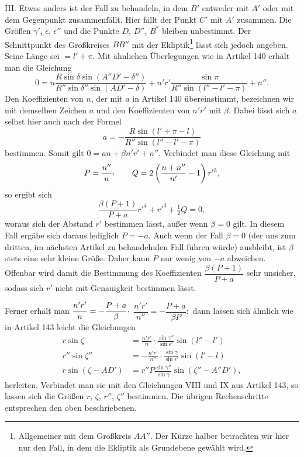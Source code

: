 III. Etwas anders ist der Fall zu behandeln, in dem $B'$ entweder mit $A'$ oder mit dem Gegenpunkt zusammenfällt. Hier fällt der Punkt $C'$ mit $A'$ zusammen. Die Größen $\gamma'$, $\epsilon$, $\epsilon''$ und die Punkte $D$, $D''$, $B^*$ bleiben unbestimmt. Der Schnittpunkt des Großkreises $BB''$ mit der Ekliptik\footnote{Allgemeiner mit dem Großkreis $AA''$. Der Kürze halber betrachten wir hier nur den Fall, in dem die Ekliptik als Grundebene gewählt wird.} lässt sich jedoch angeben. Seine Länge sei $=l'+\pi$. Mit ähnlichen Überlegungen wie in Artikel 140 erhält man die Gleichung
\[
0=n\frac{R\sin\delta\sin(A''D'-\delta'')}{R''\sin\delta''\sin(AD'-\delta)}
+n'r'\frac{\sin\pi}{R''\sin(l''-l'-\pi)}+n''.
\]
Den Koeffizienten von $n$, der mit $a$ in Artikel 140 übereinstimmt, bezeichnen wir mit demselben Zeichen $a$ und den Koeffizienten von $n'r'$ mit $\beta$. Dabei lässt sich $a$ selbst hier auch nach der Formel
\[
a=-\frac{R\sin(l'+\pi-l)}{R''\sin(l''-l'-\pi)}
\]
bestimmen. Somit gilt $0=an+\beta n'r'+n''$. Verbindet man diese Gleichung mit
\[
P=\frac{n''}{n}\mathpunct{\raisebox{.45ex}{,}}\qquad
Q=2\left(\frac{n+n''}{n'}-1\right)r'^3,
\]
so ergibt sich
\[
\frac{\beta(P+1)}{P+a}r'^4+r'^3+\tfrac12Q=0,
\]
woraus sich der Abstand $r'$ bestimmen lässt, außer wenn $\beta=0$ gilt. In diesem Fall ergäbe sich daraus lediglich $P=-a$. Auch wenn der Fall $\beta=0$ (der uns zum dritten, im nächsten Artikel zu behandelnden Fall führen würde) ausbleibt, ist $\beta$ stets eine sehr kleine Größe. Daher kann $P$ nur wenig von $-a$ abweichen. Offenbar wird damit die Bestimmung des Koeffizienten $\dfrac{\beta(P+1)}{P+a}$ sehr unsicher, sodass sich $r'$ nicht mit Genauigkeit bestimmen lässt.

Ferner erhält man $\dfrac{n'r'}{n}=-\dfrac{P+a}{\beta}\mathpunct{\raisebox{.45ex}{,}}$
$\dfrac{n'r'}{n''}=-\dfrac{P+a}{\beta P}\mathpunct{:}$ dann lassen sich ähnlich wie in Artikel 143 leicht die Gleichungen
\[
\begin{aligned}
r\sin\zeta&=\frac{n'r'}{n}\cdot\frac{\sin\gamma''}{\sin\epsilon'}\sin(l''-l')\\[.5em]
r''\sin\zeta''&=-\frac{n'r'}{n''}\cdot\frac{\sin\gamma}{\sin\epsilon'}\sin(l'-l)\\[.5em]
r\sin(\zeta-AD')&=r''P\frac{\sin\gamma''}{\sin\gamma}\sin(\zeta''-A''D'),
\end{aligned}
\]
herleiten. Verbindet man sie mit den Gleichungen VIII und IX aus Artikel 143, so lassen sich die Größen $r$, $\zeta$, $r''$, $\zeta''$ bestimmen. Die übrigen Rechenschritte entsprechen den oben beschriebenen.
